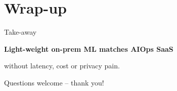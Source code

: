 \documentclass[15pt,aspectratio=169]{beamer}
\begin{document}
\section{Wrap-up}
\begin{frame}{Take-away}
\vspace{2em}
\centering
{\Large
  \textbf{Light-weight on-prem ML matches AIOps SaaS}\par
  \vspace{.4em}
  without latency, cost or privacy pain.
}

\vspace{2.2em}
\small
Questions welcome -- thank you!
\end{frame}
\end{document}
